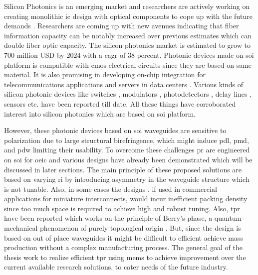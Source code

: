 \documentclass[../report.tex]{subfiles}
\begin{document}
Silicon Photonics is an emerging market and researchers are actively working on creating monolithic \gls{ic} design with optical components to cope up with the future demands \cite{optical_linking}. Researchers are coming up with new avenues indicating that fiber information capacity can be notably increased over previous estimates \cite{temprana_overcoming_2015} which can double fiber optic capacity. The silicon photonics market is estimated to grow to 700 million USD by 2024 \cite{silicon_photonics_growth_2015} with a \gls{cagr} of 38 percent. Photonic devices made on \gls{soi} platform is compatible with \gls{cmos} electrical circuits since they are based on same material. It is also promising in developing on-chip integration for telecommunications applications and servers in data centers \cite{jalali_silicon_2006}. Various kinds of silicon photonic devices like switches \cite{wu_mems-enabled_2015,nikolova_scaling_2015,lu_low-power_2014}, modulators \cite{dong_silicon_2015,chen_generation_2013}, photodetectors \cite{urino_demonstration_2012,chang_high-power_2015}, delay lines \cite{garcia_design_2015,mattarei_variable_2014}, sensors \cite{janz_silicon_2007,lim_laser_2010,ryckeboer_glucose_2014} etc. have been reported till date. All these things have corroborated interest into silicon photonics which are based on \gls{soi} platform.\par   

However, these photonic devices based on \gls{soi} waveguides are sensitive to polarization due to large structural birefringence, which might induce \gls{pdl}, \gls{pmd}, and \gls{pdw} limiting their usability. To overcome these challenges \gls{pr} are engineered on \gls{soi} for \gls{oeic} and various designs have already been demonstrated \cite{xie_efficient_2015,velasco_ultracompact_2012,leung_numerical_2011,wang_design_2014,dai_novel_2011,wirth_efficient_2012,chen_compact_2011} which will be discussed in later sections. The main principle of these proposed solutions are based on varying \gls{ri} by introducing asymmetry in the waveguide structure which is not tunable. Also, in some cases the designs \cite{sarmiento-merenguel_demonstration_2015}, if used in commercial applications for miniature interconnects, would incur inefficient packing density since too much space is required to achieve high and robust tuning. Also, \gls{tpr} have been reported which works on the principle of Berry’s phase, a quantum-mechanical phenomenon of purely topological origin \cite{xu_electrically_2014}. But, since the design is based on out of place waveguides it might be difficult to efficient achieve mass production without a complex manufacturing process. The general goal of the thesis work to realize efficient \gls{tpr} using \gls{mems} to achieve improvement over the current available research solutions, to cater needs of the future industry.    
\end{document}

